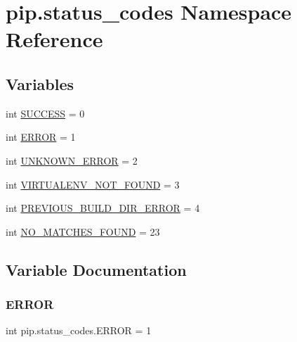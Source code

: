 \hypertarget{namespacepip_1_1status__codes}{}\section{pip.\+status\+\_\+codes Namespace Reference}
\label{namespacepip_1_1status__codes}
\subsection*{Variables}
\begin{DoxyCompactItemize}
\item 
int \hyperlink{namespacepip_1_1status__codes_ad2e112d2bd6bf7bc308763bb492cc3a5}{S\+U\+C\+C\+E\+SS} = 0
\item 
int \hyperlink{namespacepip_1_1status__codes_aea9e43bc7f84d15a2091bdfb11c7205f}{E\+R\+R\+OR} = 1
\item 
int \hyperlink{namespacepip_1_1status__codes_a7633b33741d906413d8eb4622b7b6e1d}{U\+N\+K\+N\+O\+W\+N\+\_\+\+E\+R\+R\+OR} = 2
\item 
int \hyperlink{namespacepip_1_1status__codes_a32890420dff4e682de633f9e9584b3d0}{V\+I\+R\+T\+U\+A\+L\+E\+N\+V\+\_\+\+N\+O\+T\+\_\+\+F\+O\+U\+ND} = 3
\item 
int \hyperlink{namespacepip_1_1status__codes_a4b410f0364cedf158b337d327850fc34}{P\+R\+E\+V\+I\+O\+U\+S\+\_\+\+B\+U\+I\+L\+D\+\_\+\+D\+I\+R\+\_\+\+E\+R\+R\+OR} = 4
\item 
int \hyperlink{namespacepip_1_1status__codes_ababc46a2b2382e7fd79fc59b1351ec66}{N\+O\+\_\+\+M\+A\+T\+C\+H\+E\+S\+\_\+\+F\+O\+U\+ND} = 23
\end{DoxyCompactItemize}


\subsection{Variable Documentation}
\mbox{\label{namespacepip_1_1status__codes_aea9e43bc7f84d15a2091bdfb11c7205f}} 
\subsubsection{\texorpdfstring{E\+R\+R\+OR}{ERROR}}
{\footnotesize\ttfamily int pip.\+status\+\_\+codes.\+E\+R\+R\+OR = 1}

